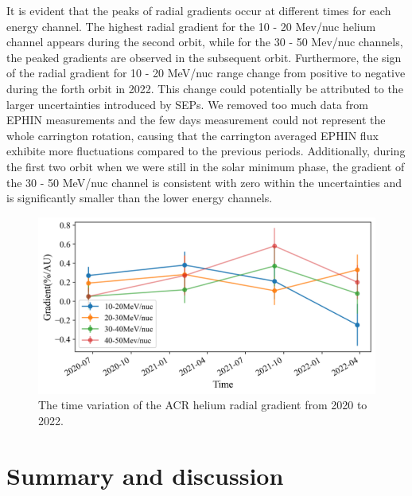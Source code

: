 It is evident that the peaks of radial gradients occur at different times for each energy channel. The highest radial gradient for the 10 - 20 Mev/nuc helium channel appears during the second orbit, while for the 30 - 50 Mev/nuc channels, the peaked gradients are observed in the subsequent orbit.
Furthermore, the sign of the radial gradient for 10 - 20 MeV/nuc range change from positive to negative during the forth orbit in 2022. This change could potentially be attributed to the larger uncertainties introduced by \acp{SEP}. We removed too much data from \ac{EPHIN} measurements and the few days measurement could not represent the whole carrington rotation, causing that the carrington averaged \ac{EPHIN} flux exhibite more fluctuations compared to the previous periods.
Additionally, during the first two orbit when we were still in the solar minimum phase, the gradient of the 30 - 50 MeV/nuc channel is consistent with zero within the uncertainties and is significantly smaller than the lower energy channels.

\begin{figure}[!htb]
    \centering
    \includegraphics[width = \textwidth, height = 0.3\textheight]{images/ACR/timevariation_normalmask_gradient.png}
    \caption[The time variation of the \ac{ACR} helium radial gradient]{The time variation of the \ac{ACR} helium radial gradient from 2020 to 2022. }
    \label{fig:radialgradient_time_variation}
\end{figure}



\section{ Summary and discussion}

